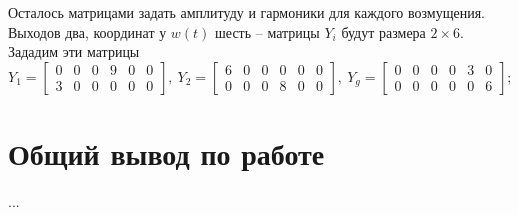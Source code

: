 \documentclass[a4paper, 12pt]{article}
\begin{document}
    Осталось матрицами задать амплитуду и гармоники для каждого возмущения. Выходов два,
    координат у $w(t)$ шесть -- матрицы $Y_i$ будут размера $2\times6$. Зададим эти матрицы
    $$
    Y_1=\begin{bmatrix}
        0 &0 &0 &9 &0 &0\\
        3 &0 &0 &0 &0 &0
    \end{bmatrix},\ Y_2=\begin{bmatrix}
        6 &0 &0 &0 &0 &0\\
        0 &0 &0 &8 &0 &0
    \end{bmatrix},\ Y_g=\begin{bmatrix}
        0 &0 &0 &0 &3 &0\\
        0 &0 &0 &0 &0 &6
    \end{bmatrix};
    $$


    \section{Общий вывод по работе}
    ...
\end{document}
